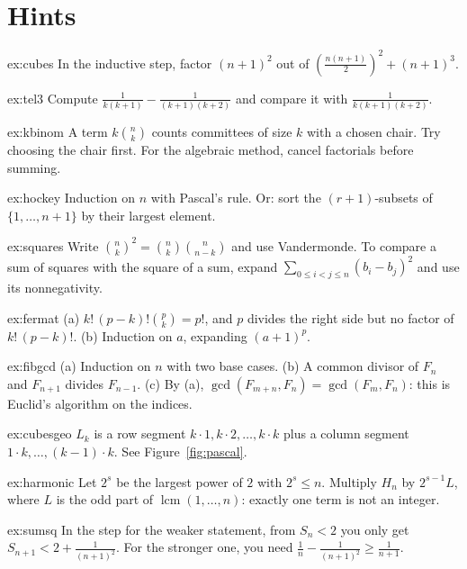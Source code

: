 \section{Hints}

\begin{hint}{ex:cubes}
In the inductive step, factor $(n+1)^2$ out of $\left(\frac{n(n+1)}2\right)^2+(n+1)^3$.
\end{hint}
\begin{hint}{ex:tel3}
Compute $\frac1{k(k+1)}-\frac1{(k+1)(k+2)}$ and compare it with $\frac1{k(k+1)(k+2)}$.
\end{hint}
\begin{hint}{ex:kbinom}
A term $k\binom nk$ counts committees of size $k$ with a chosen chair. Try choosing the chair first. For the algebraic method, cancel factorials before summing.
\end{hint}
\begin{hint}{ex:hockey}
Induction on $n$ with Pascal's rule. Or: sort the $(r+1)$-subsets of $\{1,\dots,n+1\}$ by their largest element.
\end{hint}
\begin{hint}{ex:squares}
Write $\binom nk^2=\binom nk\binom n{n-k}$ and use Vandermonde. To compare a sum of squares with the square of a sum, expand $\sum_{0\le i<j\le n}(b_i-b_j)^2$ and use its nonnegativity.
\end{hint}
\begin{hint}{ex:fermat}
(a) $k!\,(p-k)!\binom pk=p!$, and $p$ divides the right side but no factor of $k!\,(p-k)!$. (b) Induction on $a$, expanding $(a+1)^p$.
\end{hint}
\begin{hint}{ex:fibgcd}
(a) Induction on $n$ with two base cases. (b) A common divisor of $F_n$ and $F_{n+1}$ divides $F_{n-1}$. (c) By (a), $\gcd(F_{m+n},F_n)=\gcd(F_m,F_n)$: this is Euclid's algorithm on the indices.
\end{hint}
\begin{hint}{ex:cubesgeo}
$L_k$ is a row segment $k\cdot1,k\cdot2,\dots,k\cdot k$ plus a column segment $1\cdot k,\dots,(k-1)\cdot k$. See Figure~\ref{fig:pascal}.
\end{hint}
\begin{hint}{ex:harmonic}
Let $2^s$ be the largest power of $2$ with $2^s\le n$. Multiply $H_n$ by $2^{s-1}L$, where $L$ is the odd part of $\operatorname{lcm}(1,\dots,n)$: exactly one term is not an integer.
\end{hint}
\begin{hint}{ex:sumsq}
In the step for the weaker statement, from $S_n<2$ you only get $S_{n+1}<2+\frac1{(n+1)^2}$. For the stronger one, you need $\frac1n-\frac1{(n+1)^2}\ge\frac1{n+1}$.
\end{hint}
